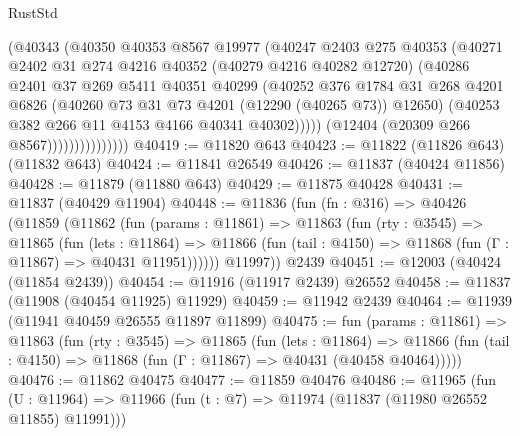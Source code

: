 \begin{lexlean}{RustStd}
\begin{coremodule}
                          (@40343
                            (@40350
                              @40353
                              @8567
                              @19977
                              (@40247
                                @2403
                                @275
                                @40353
                                (@40271
                                  @2402
                                  @31
                                  @274
                                  @4216
                                  @40352
                                  (@40279 @4216 @40282 @12720)
                                  (@40286
                                    @2401
                                    @37
                                    @269
                                    @5411
                                    @40351
                                    @40299
                                    (@40252
                                      @376
                                      @1784
                                      @31
                                      @268
                                      @4201
                                      @6826
                                      (@40260 @73 @31 @73 @4201 (@12290 (@40265 @73)) @12650)
                                      (@40253 @382 @266 @11 @4153 @4166 @40341 @40302)))))
                              (@12404 (@20309 @266 @8567)))))))))))))))
@40419 := @11820 @643
@40423 := @11822 (@11826 @643) (@11832 @643)
@40424 := @11841 @26549
@40426 := @11837 (@40424 @11856)
@40428 := @11879 (@11880 @643)
@40429 := @11875 @40428
@40431 := @11837 (@40429 @11904)
@40448 := @11836
    (fun (fn : @316) =>
    @40426
      (@11859
        (@11862
          (fun (params : @11861) =>
          @11863
            (fun (rty : @3545) =>
            @11865
              (fun (lets : @11864) =>
              @11866 (fun (tail : @4150) => @11868 (fun (Γ : @11867) => @40431 @11951))))))
        @11997))
    @2439
@40451 := @12003 (@40424 (@11854 @2439))
@40454 := @11916 (@11917 @2439) @26552
@40458 := @11837 (@11908 (@40454 @11925) @11929)
@40459 := @11942 @2439
@40464 := @11939 (@11941 @40459 @26555 @11897 @11899)
@40475 := fun (params : @11861) =>
  @11863
    (fun (rty : @3545) =>
    @11865
      (fun (lets : @11864) =>
      @11866 (fun (tail : @4150) => @11868 (fun (Γ : @11867) => @40431 (@40458 @40464)))))
@40476 := @11862 @40475
@40477 := @11859 @40476
@40486 := @11965
    (fun (U : @11964) => @11966 (fun (t : @7) => @11974 (@11837 (@11980 @26552 @11855) @11991)))

\end{coremodule}
\end{lexlean}
